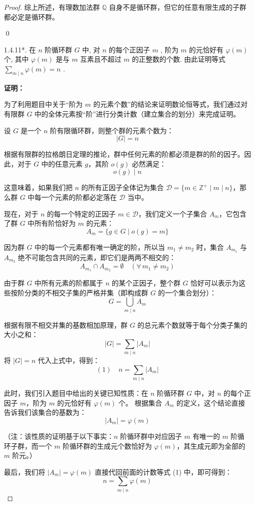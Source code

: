 \documentclass[]{article}
\begin{document}
\begin{proof}
\bigskip
综上所述，有理数加法群 $\mathbb{Q}$ 自身不是循环群，但它的任意有限生成的子群都必定是循环群。

\qed

1.4.11*. 在 $n$ 阶循环群 $G$ 中, 对 $n$ 的每个正因子 $m$ , 阶为 $m$ 的元恰好有 $\varphi(m)$ 个, 其中 $\varphi(m)$ 是与 $m$ 互素且不超过 $m$ 的正整数的个数. 由此证明等式 $\sum_{m \mid n} \varphi(m) = n$ . 

\bigskip
\noindent \textbf{证明：} 

为了利用题目中关于“阶为 $m$ 的元素个数”的结论来证明数论恒等式，我们通过对有限群 $G$ 中的全体元素按“阶”进行分类计数（建立集合的划分）来完成证明。

设 $G$ 是一个 $n$ 阶有限循环群，则整个群的元素个数为：
\[ |G| = n \]

根据有限群的拉格朗日定理的推论，群中任何元素的阶都必须是群的阶的因子。因此，对于 $G$ 中的任意元素 $g$，其阶 $o(g)$ 必然满足：
\[ o(g) \mid n \]

这意味着，如果我们把 $n$ 的所有正因子全体记为集合 $\mathcal{D} = \{ m \in \mathbb{Z}^+ \mid m \mid n \}$，那么群 $G$ 中每一个元素的阶都必定落在 $\mathcal{D}$ 当中。

现在，对于 $n$ 的每一个特定的正因子 $m \in \mathcal{D}$，我们定义一个子集合 $A_m$，它包含了群 $G$ 中所有阶恰好为 $m$ 的元素：
\[ A_m = \{ g \in G \mid o(g) = m \} \]

因为群 $G$ 中的每一个元素都有唯一确定的阶，所以当 $m_1 \neq m_2$ 时，集合 $A_{m_1}$ 与 $A_{m_2}$ 绝不可能包含共同的元素，即它们是两两不相交的：
\[ A_{m_1} \cap A_{m_2} = \emptyset \quad (\forall \, m_1 \neq m_2) \]

由于群 $G$ 中所有元素的阶都属于 $n$ 的某个正因子，整个群 $G$ 恰好可以表示为这些按阶分类的不相交子集的严格并集（即构成群 $G$ 的一个集合划分）：
\[ G = \bigcup_{m \mid n} A_m \]

根据有限不相交并集的基数相加原理，群 $G$ 的总元素个数就等于每个分类子集的大小之和：
\[ |G| = \sum_{m \mid n} |A_m| \]
将 $|G| = n$ 代入上式中，得到：
\[ (1) \quad n = \sum_{m \mid n} |A_m| \]

此时，我们引入题目中给出的关键已知性质：在 $n$ 阶循环群 $G$ 中，对 $n$ 的每个正因子 $m$，阶为 $m$ 的元恰好有 $\varphi(m)$ 个。
根据集合 $A_m$ 的定义，这个结论直接告诉我们该集合的基数为：
\[ |A_m| = \varphi(m) \]

（注：该性质的证明基于以下事实：$n$ 阶循环群中对应因子 $m$ 有唯一的 $m$ 阶循环子群，而一个 $m$ 阶循环群的生成元个数恰好为 $\varphi(m)$，其生成元即为全部的 $m$ 阶元。）

最后，我们将 $|A_m| = \varphi(m)$ 直接代回前面的计数等式 (1) 中，即可得到：
\[ n = \sum_{m \mid n} \varphi(m) \]


\end{proof}
\end{document}
